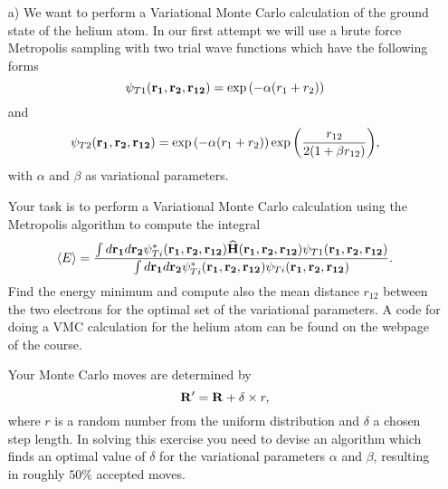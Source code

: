 \documentclass[10pt]{article}
\newcommand{\OP}[1]{{\bf\widehat{#1}}}
\begin{document}
\begin{enumerate}

\item[a)] We want to perform  a Variational Monte Carlo calculation of the ground state of the helium atom.
In our first attempt we will use a brute force Metropolis sampling with two trial wave functions which have the following forms
\begin{equation}
   \psi_{T1}({\bf r_1},{\bf r_2}, {\bf r_{12}}) = 
   \exp{\left(-\alpha(r_1+r_2)\right)}
\label{eq:trial1}
\end{equation}
and
\begin{equation}
   \psi_{T2}({\bf r_1},{\bf r_2}, {\bf r_{12}}) = 
   \exp{\left(-\alpha(r_1+r_2)\right)}
   \exp{\left(\frac{r_{12}}{2(1+\beta r_{12})}\right)}, 
\label{eq:trial2}
\end{equation}
with $\alpha$ and $\beta$ as variational parameters.

Your task is to perform a Variational Monte Carlo calculation
using the Metropolis algorithm to compute the integral
\begin{equation}
   \langle E \rangle =
   \frac{\int d{\bf r_1}d{\bf r_2}\psi^{\ast}_{Ti}({\bf r_1},{\bf r_2}, {\bf r_{12}})\OP{H}({\bf r_1},{\bf r_2}, {\bf r_{12}})\psi_{T1}({\bf r_1},{\bf r_2}, {\bf r_{12}})}
        {\int d{\bf r_1}d{\bf r_2}\psi^{\ast}_{Ti}({\bf r_1},{\bf r_2}, {\bf r_{12}})\psi_{Ti}({\bf r_1},{\bf r_2}, {\bf r_{12}})}.
\end{equation}
Find the  energy minimum and compute also the mean distance
$r_{12}$ between the two electrons for the optimal set of the variational parameters.
A code for doing a VMC calculation for the helium atom can be 
found on the webpage of the course.

Your Monte Carlo moves are determined by
\begin{equation}
   {\bf R}' = {\bf R} +\delta \times r,
\end{equation}
where $r$ is a random number from the uniform distribution and $\delta$
a chosen step length.
In solving this exercise you need to devise an algorithm which finds
an optimal value of $\delta$ for the variational parameters $\alpha$ and $\beta$,
resulting in roughly $50\%$ accepted moves. 


\end{enumerate}
\end{document}
